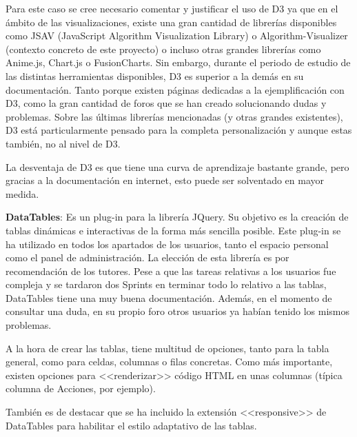 Para este caso se cree necesario comentar y justificar el uso de D3 ya que en el
ámbito de las visualizaciones, existe una gran cantidad de librerías disponibles
como JSAV (JavaScript Algorithm Visualization Library) o Algorithm-Visualizer
(contexto concreto de este proyecto) o incluso otras grandes librerías como
Anime.js, Chart.js o FusionCharts. Sin embargo, durante el periodo de estudio de
las distintas herramientas disponibles, D3 es superior a la demás en su
documentación. Tanto porque existen páginas dedicadas a la ejemplificación con
D3, como la gran cantidad de foros que se han creado solucionando dudas y
problemas. Sobre las últimas librerías mencionadas (y otras grandes existentes),
D3 está particularmente pensado para la completa personalización y aunque estas
también, no al nivel de D3.

La desventaja de D3 es que tiene una curva de aprendizaje bastante grande, pero
gracias a la documentación en internet, esto puede ser solventado en mayor
medida.

\textbf{DataTables}: Es un plug-in para la librería JQuery. Su objetivo es la
creación de tablas dinámicas e interactivas de la forma más sencilla posible.
Este plug-in se ha utilizado en todos los apartados de los usuarios, tanto el
espacio personal como el panel de administración. La elección de esta librería
es por recomendación de los tutores. Pese a que las tareas relativas a los
usuarios fue compleja y se tardaron dos Sprints en terminar todo lo relativo a
las tablas, DataTables tiene una muy buena documentación. Además, en el momento
de consultar una duda, en su propio foro otros usuarios ya habían tenido los
mismos problemas.

A la hora de crear las tablas, tiene multitud de opciones, tanto para la tabla
general, como para celdas, columnas o filas concretas. Como más importante,
existen opciones para <<renderizar>> código HTML en unas columnas (típica
columna de Acciones, por ejemplo).

También es de destacar que se ha incluido la extensión <<responsive>> de
DataTables para habilitar el estilo adaptativo de las tablas.